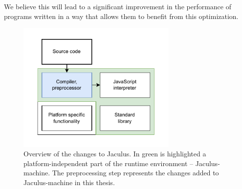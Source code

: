 We believe this will lead to a significant improvement in the performance of programs written in a way that allows them to benefit from this optimization.

\begin{figure}[!b]
    \centering
    \includegraphics[width=0.7\textwidth, draft=false]{assets/img/overview.pdf}
    \caption{Overview of the changes to Jaculus. In green is highlighted a platform-independent part of the runtime environment -- Jaculus-machine. The preprocessing step represents the changes added to Jaculus-machine in this thesis.}
    \label{fig:overview}
\end{figure}
